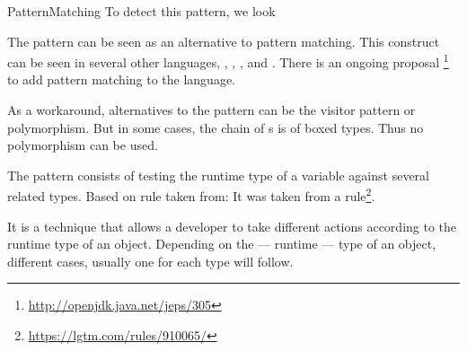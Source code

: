 \begin{pattern}{PatternMatching}
\detection{}
To detect this pattern, we look

\discussion{}
The \thisp{} pattern can be seen as an \adhoc{}
alternative to pattern matching.
This construct can be seen in several other languages, \eg,
\haskell{}, \scala{}, and \csharp{}.
There is an ongoing proposal%
\footnote{\url{http://openjdk.java.net/jeps/305}} to add pattern
matching to the \java{} language.

As a workaround, alternatives to the \thisp{} pattern can be the
visitor pattern or polymorphism.
But in some cases, the chain of s is of boxed types.
Thus no polymorphism can be used.


The \thisp{} pattern consists of testing the runtime type of a variable against several related types.
Based on rule taken from:
It was taken from a \lgtm{} rule\footnote{\url{https://lgtm.com/rules/910065/}}.

It is a technique that allows a developer to take different actions according to the runtime type of an object.
Depending on the --- runtime --- type of an object, different cases, usually one for each type will follow.

\end{pattern}
